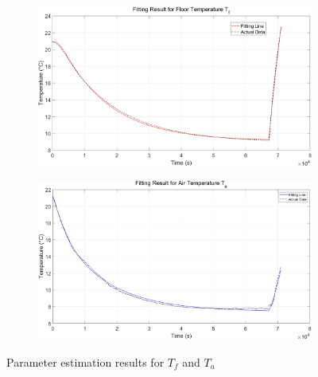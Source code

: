 \documentclass[../main.tex]{subfiles}
\begin{document}
\begin{figure}[H]
\centering
\begin{subfigure}{0.9\textwidth}
    \includegraphics[width=\linewidth]{figures/fitting_floor_temp.png}
    \label{fig:fit_floor}
\end{subfigure}
\begin{subfigure}{0.9\textwidth}
    \includegraphics[width=\linewidth]{figures/fitting_air_temp.png}
    \label{fig:fit_air}
\end{subfigure}
\caption{Parameter estimation results for $T_f$ and $T_a$}
\label{fig:fit}
\end{figure}

\end{document}
